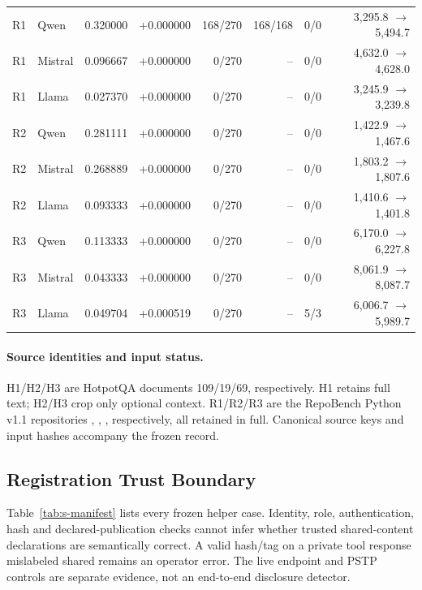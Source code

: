 \begin{table}[t]
\begin{tabular}{@{}llrrrrrr@{}}
R1 & Qwen & 0.320000 & +0.000000 & 168/270 & 168/168 & 0/0 & 3,295.8 $\rightarrow$ 5,494.7\\
R1 & Mistral & 0.096667 & +0.000000 & 0/270 & -- & 0/0 & 4,632.0 $\rightarrow$ 4,628.0\\
R1 & Llama & 0.027370 & +0.000000 & 0/270 & -- & 0/0 & 3,245.9 $\rightarrow$ 3,239.8\\
R2 & Qwen & 0.281111 & +0.000000 & 0/270 & -- & 0/0 & 1,422.9 $\rightarrow$ 1,467.6\\
R2 & Mistral & 0.268889 & +0.000000 & 0/270 & -- & 0/0 & 1,803.2 $\rightarrow$ 1,807.6\\
R2 & Llama & 0.093333 & +0.000000 & 0/270 & -- & 0/0 & 1,410.6 $\rightarrow$ 1,401.8\\
R3 & Qwen & 0.113333 & +0.000000 & 0/270 & -- & 0/0 & 6,170.0 $\rightarrow$ 6,227.8\\
R3 & Mistral & 0.043333 & +0.000000 & 0/270 & -- & 0/0 & 8,061.9 $\rightarrow$ 8,087.7\\
R3 & Llama & 0.049704 & +0.000519 & 0/270 & -- & 5/3 & 6,006.7 $\rightarrow$ 5,989.7\\
\bottomrule
\end{tabular}
\end{table}

\paragraph{Source identities and input status.}
H1/H2/H3 are HotpotQA documents 109/19/69, respectively. H1 retains full text; H2/H3 crop only optional context.
R1/R2/R3 are the RepoBench Python v1.1 repositories , , , respectively, all retained in full. Canonical source keys and input hashes accompany the frozen record.

\subsection{Registration Trust Boundary}
Table~\ref{tab:s-manifest} lists every frozen helper case. Identity, role, authentication, hash and declared-publication checks cannot infer whether trusted shared-content declarations are semantically correct. A valid hash/tag on a private tool response mislabeled shared remains an operator error. The live endpoint and PSTP controls are separate evidence, not an end-to-end disclosure detector.

